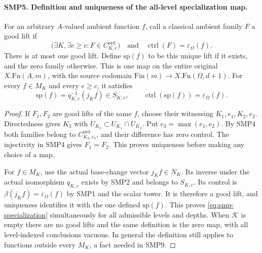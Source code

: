 \documentclass[11pt,a4paper]{article}
\numberwithin{equation}{section}
\theoremstyle{remark}\newtheorem{remark}[theorem]{Remark}
\begin{document}
\paragraph{SMP5. Definition and uniqueness of the all-level specialization map.}
\label{claim:SMP5}
For an arbitrary $A$-valued ambient function $f$, call
a classical ambient family $F$ a good lift if
\begin{equation}\label{eq:smp-good}
 \bigl(\exists K,\exists e\geq c:
                   F\in C^{\mathrm{ord}}_{K,\allowbreak{} e}\bigr)
       \quad\text{and}\quad
             \operatorname{ctrl}(F)=\varepsilon_\Omega(f).
\end{equation}
There is at most one good lift.  Define $\mathrm{sp}(f)$
to be this unique lift if it exists, and the zero family
otherwise.  This is one map on the entire original
$X.\mathrm{Fn}(A,\allowbreak{} m)$, with the source codomain
$\mathrm{Fin}(m)\to X.\mathrm{Fn}(\Omega,\allowbreak{} d+1)$.
For every $f\in M_K$ and every $e\geq c$, it satisfies
\begin{equation}\label{eq:smp-specialization}
 \mathrm{sp}(f)=q_{K,\allowbreak{} e}^{-1}(j_K f)\in S_{K,\allowbreak{} e},\qquad
       \operatorname{ctrl}(\mathrm{sp}(f))=
                                        \varepsilon_\Omega(f).
\end{equation}
\begin{proof}
If $F_1,\allowbreak{} F_2$ are good lifts of the same $f$, choose
their witnessing $K_1,\allowbreak{} e_1,\allowbreak{} K_2,\allowbreak{} e_2$.  Directedness gives
$K_3$ with $U_{K_3}\subset U_{K_1}\cap U_{K_2}$.
Put $e_3=\max(e_1,\allowbreak{} e_2)$.  By SMP4 both families belong
to $C^{\mathrm{ord}}_{K_3,\allowbreak{} e_3}$, and their difference
has zero control.  The injectivity in SMP4 gives
$F_1=F_2$.  This proves uniqueness before making any
choice of a map.

For $f\in M_K$, use the actual base-change vector
$j_K f\in N_K$.  Its inverse under the actual isomorphism
$q_{K,\allowbreak{} e}$ exists by SMP2 and belongs to $S_{K,\allowbreak{} e}$.
Its control is $\beta(j_K f)=\varepsilon_\Omega(f)$
by SMP1 and the scalar tower.  It is therefore a good
lift, and uniqueness identifies it with the one
defined $\mathrm{sp}(f)$.  This proves
\eqref{eq:smp-specialization} simultaneously for all
admissible levels and depths.  When $\mathcal K$ is
empty there are no good lifts and the same definition
is the zero map, with all level-indexed conclusions
vacuous.  In general the definition still applies to
functions outside every $M_K$, a fact needed in SMP9.
\end{proof}
\end{document}
